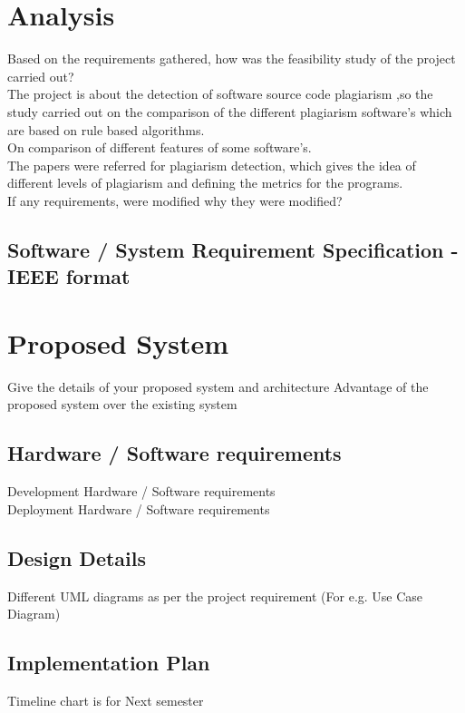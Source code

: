 \section{Analysis}

Based on the requirements gathered, how was the feasibility study of the project carried out? \\
The project is about the detection of software source code plagiarism ,so the study carried out on the comparison of the different plagiarism software's which are based on rule based algorithms.\\
On comparison of different features of some software's.\\
The papers were referred for plagiarism detection, which gives the idea of different levels of plagiarism and defining the metrics for the programs.  \\
If any requirements, were modified why they were modified? \\
\subsection{Software / System Requirement Specification - IEEE format}

\section{Proposed System}

Give the details of your proposed system and architecture 
Advantage of the proposed system over the existing system

\subsection{Hardware / Software requirements}
Development Hardware / Software requirements \\
Deployment Hardware / Software requirements \\

\subsection{Design Details}

Different UML diagrams as per the project requirement (For e.g. Use Case Diagram)

\subsection{Implementation Plan}

Timeline chart is for Next semester
